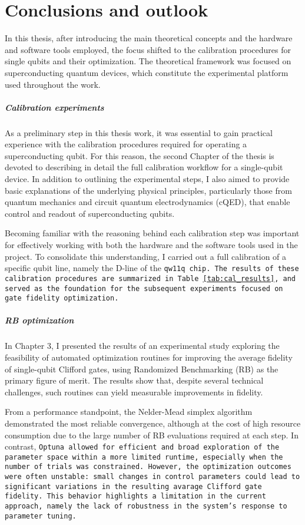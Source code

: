 \chapter{Conclusions and outlook}

In this thesis, after introducing the main theoretical concepts and the hardware and software tools employed, the focus shifted to the calibration procedures for single qubits and their optimization. 
The theoretical framework was focused on superconducting quantum devices, which constitute the experimental platform used throughout the work.

\paragraph{Calibration experiments}
As a preliminary step in this thesis work, it was essential to gain practical experience with the calibration procedures required for operating a superconducting qubit. 
For this reason, the second Chapter of the thesis is devoted to describing in detail the full calibration workflow for a single-qubit device. 
In addition to outlining the experimental steps, I also aimed to provide basic explanations of the underlying physical principles, particularly those from quantum mechanics and circuit quantum electrodynamics (cQED), that enable control and readout of superconducting qubits. 

Becoming familiar with the reasoning behind each calibration step was important for effectively working with both the hardware and the software tools used in the project.
To consolidate this understanding, I carried out a full calibration of a specific qubit line, namely the D-line of the \tt{qw11q} chip. 
The results of these calibration procedures are summarized in Table \ref{tab:cal_results}, and served as the foundation for the subsequent experiments focused on gate fidelity optimization.

\paragraph{RB optimization}
In Chapter 3, I presented the results of an experimental study exploring the feasibility of automated optimization routines for improving the average fidelity of single-qubit Clifford gates, using Randomized Benchmarking (RB) as the primary figure of merit. 
The results show that, despite several technical challenges, such routines can yield measurable improvements in fidelity.

From a performance standpoint, the Nelder-Mead simplex algorithm demonstrated the most reliable convergence, although at the cost of high resource consumption due to the large number of RB evaluations required at each step. 
In contrast, \tt{Optuna} allowed for efficient and broad exploration of the parameter space within a more limited runtime, especially when the number of trials was constrained. 
However, the optimization outcomes were often unstable: small changes in control parameters could lead to significant variations in the resulting avarage Clifford gate fidelity. 
This behavior highlights a limitation in the current approach, namely the lack of robustness in the system's response to parameter tuning.

